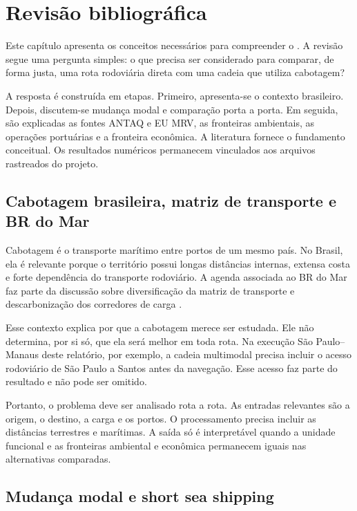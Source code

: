 \chapter{Revisão bibliográfica}
\label{ch:revisao}

Este capítulo apresenta os conceitos necessários para compreender o \CabotageLens{}. A revisão segue uma pergunta simples: o que precisa ser considerado para comparar, de forma justa, uma rota rodoviária direta com uma cadeia que utiliza cabotagem?

A resposta é construída em etapas. Primeiro, apresenta-se o contexto brasileiro. Depois, discutem-se mudança modal e comparação porta a porta. Em seguida, são explicadas as fontes ANTAQ e EU MRV, as fronteiras ambientais, as operações portuárias e a fronteira econômica. A literatura fornece o fundamento conceitual. Os resultados numéricos permanecem vinculados aos arquivos rastreados do projeto.

\section{Cabotagem brasileira, matriz de transporte e BR do Mar}
\label{sec:cabotagem-br}

Cabotagem é o transporte marítimo entre portos de um mesmo país. No Brasil, ela é relevante porque o território possui longas distâncias internas, extensa costa e forte dependência do transporte rodoviário. A agenda associada ao BR do Mar faz parte da discussão sobre diversificação da matriz de transporte e descarbonização dos corredores de carga \cite{icct2022}.

Esse contexto explica por que a cabotagem merece ser estudada. Ele não determina, por si só, que ela será melhor em toda rota. Na execução São Paulo--Manaus deste relatório, por exemplo, a cadeia multimodal precisa incluir o acesso rodoviário de São Paulo a Santos antes da navegação. Esse acesso faz parte do resultado e não pode ser omitido.

Portanto, o problema deve ser analisado rota a rota. As entradas relevantes são a origem, o destino, a carga e os portos. O processamento precisa incluir as distâncias terrestres e marítimas. A saída só é interpretável quando a unidade funcional e as fronteiras ambiental e econômica permanecem iguais nas alternativas comparadas.

\section{Mudança modal e short sea shipping}
\label{sec:sss-modal-shift}

